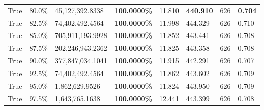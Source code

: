 \begin{table}[H]
\begin{tabular}{lllrllll}
\cline{1-8}
True & 80.0\% & 45,127,392.8338 & \bfseries \color{red} 100.0000\% & 11.810 & \bfseries \color{red} 440.910 & 626 & \bfseries \color{red} 0.704 \\
\cline{1-8}
True & 82.5\% & 74,402,492.4564 & \bfseries \color{red} 100.0000\% & 11.998 & 444.329 & 626 & 0.710 \\
\cline{1-8}
True & 85.0\% & 705,911,193.9928 & \bfseries \color{red} 100.0000\% & 11.852 & 443.441 & 626 & 0.708 \\
\cline{1-8}
True & 87.5\% & 202,246,943.2362 & \bfseries \color{red} 100.0000\% & 11.825 & 443.358 & 626 & 0.708 \\
\cline{1-8}
True & 90.0\% & 377,847,034.1041 & \bfseries \color{red} 100.0000\% & 11.915 & 442.291 & 626 & 0.707 \\
\cline{1-8}
True & 92.5\% & 74,402,492.4564 & \bfseries \color{red} 100.0000\% & 11.862 & 443.602 & 626 & 0.709 \\
\cline{1-8}
True & 95.0\% & 1,862,629.9526 & \bfseries \color{red} 100.0000\% & 11.824 & 443.950 & 626 & 0.709 \\
\cline{1-8}
True & 97.5\% & 1,643,765.1638 & \bfseries \color{red} 100.0000\% & 12.441 & 443.399 & 626 & 0.708 \\
\cline{1-8}
\bottomrule
\end{tabular}
\end{table}
